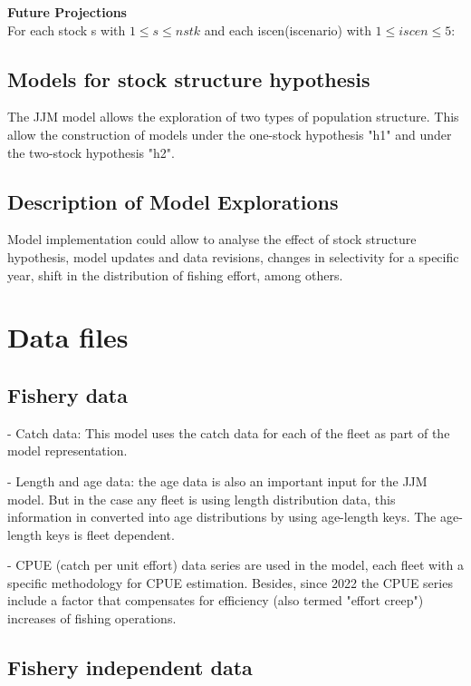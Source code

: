 \documentclass{article}
\begin{document}
\textbf{Future Projections}\\
For each stock s with $1\leq s \leq nstk$ and each iscen(iscenario) with $1\leq iscen \leq 5$:






\subsection{Models for stock structure hypothesis}

The JJM model allows the exploration of two types of population structure. This allow the construction of models under the one-stock hypothesis "h1" and under the two-stock hypothesis "h2".

\subsection{Description of Model Explorations}

Model implementation could allow to analyse the effect of stock structure hypothesis, model updates and data revisions, changes in selectivity for a specific year, shift in the distribution of fishing effort, among others. 

\section{Data files}

\subsection{Fishery data}

- Catch data: This model uses the catch data for each of the fleet as part of the model representation.

- Length and age data: the age data is also an important input for the JJM model. But in the case any fleet is using length distribution data, this information in converted into age distributions by using age-length keys. The age-length keys is fleet dependent.

- CPUE (catch per unit effort) data series are used in the model, each fleet with a specific methodology for CPUE estimation. Besides, since 2022 the CPUE series include a factor that compensates for efficiency (also termed "effort creep") increases of fishing operations.

\subsection{Fishery independent data}
\end{document}
